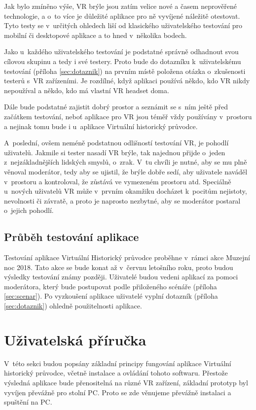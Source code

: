 \documentclass[thesis=B,czech]{FITthesis}[2012/06/26]
\begin{document}
	Jak bylo zmíněno výše, VR brýle jsou zatím velice nové a časem neprověřené technologie, a o~to více je důležité aplikace pro ně vyvíjené náležitě otestovat. Tyto testy se v~určitých ohledech liší od klasického uživatelského testování pro mobilní či desktopové aplikace a to hned v~několika bodech.
	
	 Jako u~každého uživatelského testování je podstatné správně odhadnout svou cílovou skupinu a tedy i své testery. Proto bude do dotazníku k~uživatelskému testování (příloha \ref{sec:dotaznik}) na prvním místě položena otázka o~zkušenosti testerů s~VR zařízeními. Je rozdílné, když aplikaci používá někdo, kdo VR nikdy nepoužíval a někdo, kdo má vlastní VR headset doma.
	 
	 Dále bude podstatné zajistit dobrý prostor a seznámit se s~ním ještě před začátkem testování, neboť aplikace pro VR jsou téměř vždy používány v~prostoru a nejinak tomu bude i u~aplikace Virtuální historický průvodce.
	 
	 A~poslední, ovšem neméně podstatnou odlišností testování VR, je pohodlí uživatelů. Jakmile si tester nasadí VR brýle, tak najednou přijde o~jeden z~nejzákladnějších lidských smyslů, o~zrak. V~tu chvíli je nutné, aby se mu plně věnoval moderátor, tedy aby se ujistil, že brýle dobře sedí, aby uživatele naváděl v~prostoru a kontroloval, že zůstává ve vymezeném prostoru atd. Speciálně u~nových uživatelů VR může v~prvním okamžiku docházet k~pocitům nejistoty, nevolnosti či závratě, a proto je naprosto nezbytné, aby se moderátor postaral o~jejich pohodlí. \cite{VRuse}
	
	\subsection{Průběh testování aplikace}
	
	Testování aplikace Virtuální Historický průvodce proběhne v~rámci akce Muzejní noc 2018. Tato akce se bude konat až v~červnu letošního roku, proto budou výsledky testování známy později. Uživatelé budou vedeni aplikací za pomoci moderátora, který bude postupovat podle přiloženého scénáře (příloha \ref{sec:scenar}). Po vyzkoušení aplikace uživatelé vyplní dotazník (příloha \ref{sec:dotaznik}) ohledně použitelnosti aplikace.

	\section{Uživatelská příručka}
	
	V~této sekci budou popsány základní principy fungování aplikace Virtuální historický průvodce, včetně instalace a ovládání tohoto softwaru. Přestože výsledná aplikace bude přenositelná na různé VR zařízení, základní prototyp byl vyvíjen převážně pro stolní PC. Proto se zde věnujeme převážně instalaci a spuštění na PC.
\end{document}
